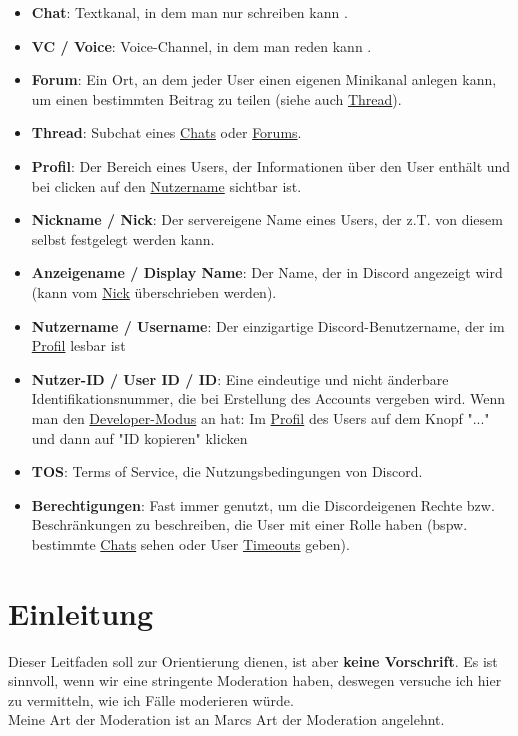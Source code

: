 \documentclass[a4paper,12pt]{article}
\begin{document}
\begin{itemize}
    \item \textbf{Chat}\hypertarget{term:chat}{}: Textkanal, in dem man nur schreiben kann .
    \item \textbf{VC / Voice}\hypertarget{term:vc}{}: Voice-Channel, in dem man reden kann .
    \item \textbf{Forum}\hypertarget{term:forum}{}: Ein Ort, an dem jeder User einen eigenen Minikanal anlegen kann, um einen bestimmten Beitrag zu teilen (siehe auch \hyperlink{term:thread}{Thread}).
    \item \textbf{Thread}\hypertarget{term:thread}{}: Subchat eines \hyperlink{term:chat}{Chats} oder \hyperlink{term:forum}{Forums}.
    \item \textbf{Profil}\hypertarget{term:profile}{}: Der Bereich eines Users, der Informationen über den User enthält und bei clicken auf den \hyperlink{term:username}{Nutzername} sichtbar ist.
    \item \textbf{Nickname / Nick}\hypertarget{term:nick}{}: Der servereigene Name eines Users, der z.T. von diesem selbst festgelegt werden kann.
    \item \textbf{Anzeigename / Display Name}\hypertarget{term:displayname}{}: Der Name, der in Discord angezeigt wird (kann vom \hyperlink{term:nick}{Nick} überschrieben werden).
    \item \textbf{Nutzername / Username}\hypertarget{term:username}{}: Der einzigartige Discord-Benutzername, der im \hyperlink{term:profile}{Profil} lesbar ist
    \item \textbf{Nutzer-ID / User ID / ID}\hypertarget{term:id}{}: Eine eindeutige und nicht änderbare Identifikationsnummer, die bei Erstellung des Accounts vergeben wird. Wenn man den \href{https://www.howtogeek.com/714348/how-to-enable-or-disable-developer-mode-on-discord/}{Developer-Modus} an hat: Im \hyperlink{term:profile}{Profil} des Users auf dem Knopf "..." und dann auf "ID kopieren" klicken
    \item \textbf{TOS}\hypertarget{term:tos}{}: Terms of Service, die Nutzungsbedingungen von Discord.
    \item \textbf{Berechtigungen}\hypertarget{term:berechtigungen}{}: Fast immer genutzt, um die Discordeigenen Rechte bzw. Beschränkungen zu beschreiben, die User mit einer Rolle haben (bspw. bestimmte \hyperlink{term:chat}{Chats} sehen oder User \hyperlink{term:to}{Timeouts} geben).
\end{itemize}

\section{Einleitung}
Dieser Leitfaden soll zur Orientierung dienen, ist aber \textbf{keine Vorschrift}. Es ist sinnvoll, wenn wir
eine stringente Moderation haben, deswegen versuche ich hier zu vermitteln, wie ich Fälle moderieren würde.\\
Meine Art der Moderation ist an Marcs Art der Moderation angelehnt.
\end{document}
